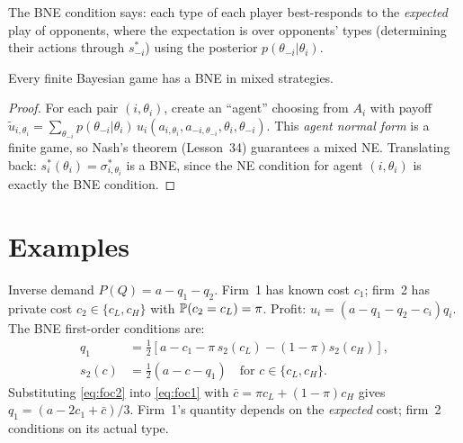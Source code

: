 \documentclass[11pt,a4paper]{article}
\begin{document}
\begin{remark}
The BNE condition says: each type of each player best-responds to the
\emph{expected} play of opponents, where the expectation is over
opponents' types (determining their actions through $s_{-i}^*$) using
the posterior $p(\theta_{-i}|\theta_i)$.
\end{remark}

\begin{keyresult}[title={BNE Existence}]
\begin{theorem}
\label{thm:bne-existence}
Every finite Bayesian game has a BNE in mixed strategies.
\end{theorem}
\end{keyresult}

\begin{proof}
For each pair $(i, \theta_i)$, create an ``agent'' choosing from $A_i$
with payoff $\tilde{u}_{i,\theta_i} = \sum_{\theta_{-i}}
p(\theta_{-i}|\theta_i)\,u_i(a_{i,\theta_i}, a_{-i,\theta_{-i}},
\theta_i, \theta_{-i})$. This \emph{agent normal form} is a finite game,
so Nash's theorem (Lesson~34) guarantees a mixed NE. Translating back:
$s_i^*(\theta_i) = \sigma_{i,\theta_i}^*$ is a BNE, since the NE
condition for agent $(i,\theta_i)$ is exactly the BNE condition.
\end{proof}


\section{Examples}
\label{sec:bayesian-examples}

\begin{example}
\label{ex:cournot}
Inverse demand $P(Q) = a - q_1 - q_2$. Firm~1 has known cost $c_1$;
firm~2 has private cost $c_2 \in \{c_L, c_H\}$ with
$\mathbb{P}(c_2 = c_L) = \pi$. Profit:
$u_i = (a - q_1 - q_2 - c_i)q_i$. The BNE first-order conditions are:
\begin{align}
    q_1 &= \tfrac{1}{2}[a - c_1 - \pi\,s_2(c_L) - (1-\pi)s_2(c_H)],
    \label{eq:foc1}\\
    s_2(c) &= \tfrac{1}{2}(a - c - q_1) \quad
    \text{for } c \in \{c_L, c_H\}. \label{eq:foc2}
\end{align}
Substituting \eqref{eq:foc2} into \eqref{eq:foc1} with
$\bar{c} = \pi c_L + (1-\pi)c_H$ gives
$q_1 = (a - 2c_1 + \bar{c})/3$. Firm~1's quantity depends on the
\emph{expected} cost; firm~2 conditions on its actual type.
\end{example}
\end{document}
